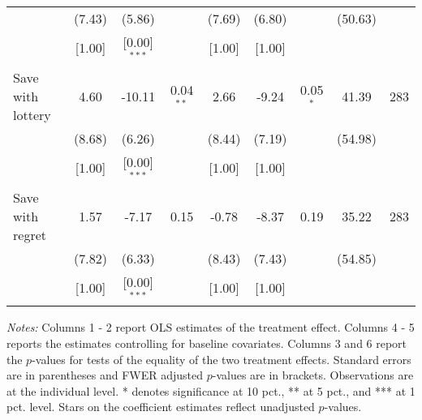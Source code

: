 \begin{table}[htbp]
{\begin{threeparttable}
\begin{tabular}{l*{8}{c}}
          &   (7.43)&   (5.86)&         &   (7.69)&   (6.80)&         &  (50.63)&         \\
          &   [1.00]&[0.00]$^{***}$&         &   [1.00]&   [1.00]&         &         &         \\
Save with lottery&     4.60&   -10.11&0.04$^{**}$&     2.66&    -9.24&0.05$^{*}$&    41.39&      283\\
          &   (8.68)&   (6.26)&         &   (8.44)&   (7.19)&         &  (54.98)&         \\
          &   [1.00]&[0.00]$^{***}$&         &   [1.00]&   [1.00]&         &         &         \\
Save with regret&     1.57&    -7.17&     0.15&    -0.78&    -8.37&     0.19&    35.22&      283\\
          &   (7.82)&   (6.33)&         &   (8.43)&   (7.43)&         &  (54.85)&         \\
          &   [1.00]&[0.00]$^{***}$&         &   [1.00]&   [1.00]&         &         &         \\
\bottomrule \end{tabular} \begin{tablenotes}[flushleft] \footnotesize \item \emph{Notes:} Columns 1 - 2 report OLS estimates of the treatment effect. Columns 4 - 5 reports the estimates controlling for baseline covariates. Columns 3 and 6 report the \(p\)-values for tests of the equality of the two treatment effects. Standard errors are in parentheses and FWER adjusted \(p\)-values are in brackets. Observations are at the individual level. * denotes significance at 10 pct., ** at 5 pct., and *** at 1 pct. level. Stars on the coefficient estimates reflect unadjusted \(p\)-values. \end{tablenotes} \end{threeparttable} } \end{table}

